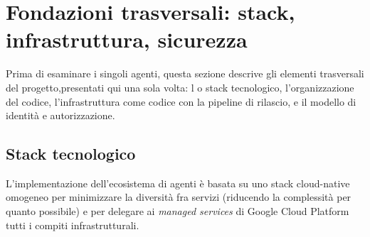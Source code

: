 \section{Fondazioni trasversali: stack, infrastruttura, sicurezza}
\label{sec:agenti-stack}

Prima di esaminare i singoli agenti, questa sezione descrive gli elementi
trasversali del progetto,presentati qui una sola volta: l
o stack tecnologico, l'organizzazione del
codice, l'infrastruttura come codice con la pipeline di rilascio, e il
modello di identità e autorizzazione.

\subsection{Stack tecnologico}
\label{subsec:agenti-stack-tech}

L'implementazione dell'ecosistema di agenti è basata su uno stack cloud-native
 omogeneo per minimizzare la diversità fra servizi (riducendo la complessità
per quanto possibile) e per delegare ai \emph{managed services} di Google Cloud Platform tutti i compiti
infrastrutturali.

